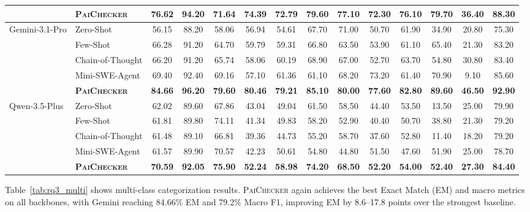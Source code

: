 \documentclass[sigconf, review, anonymous]{acmart}
\newcommand{\tool}{\textsc{PaiChecker}\xspace}
\begin{document}
\begin{table}[t]
{\begin{tabular}{ll c cccc ccccccc}
     & \textbf{\tool} & \textbf{76.62} & \textbf{94.20} & \textbf{71.64} & \textbf{74.39} & \textbf{72.79} & \textbf{79.60} & \textbf{77.10} & \textbf{72.30} & \textbf{76.10} & \textbf{79.70} & \textbf{36.40} & \textbf{88.30} \\
    \midrule
    \multirow{5}{*}{Gemini-3.1-Pro} & Zero-Shot & 56.15 & 88.20 & 58.06 & 56.94 & 54.61 & 67.70 & 71.00 & 50.70 & 61.90 & 34.90 & 20.80 & 75.30 \\
     & Few-Shot & 66.28 & 91.20 & 64.70 & 59.79 & 59.31 & 66.80 & 63.50 & 53.90 & 61.10 & 65.40 & 21.30 & 83.20 \\
     & Chain-of-Thought & 66.20 & 91.20 & 65.74 & 58.06 & 60.19 & 68.90 & 67.00 & 52.70 & 63.70 & 54.80 & 30.80 & 83.40 \\
     & Mini-SWE-Agent & 69.40 & 92.40 & 69.16 & 57.10 & 61.36 & 61.10 & 68.20 & 73.20 & 61.40 & 70.90 & 9.10 & 85.60 \\
     & \textbf{\tool} & \textbf{84.66} & \textbf{96.20} & \textbf{79.60} & \textbf{80.46} & \textbf{79.21} & \textbf{85.10} & \textbf{80.00} & \textbf{77.60} & \textbf{82.80} & \textbf{89.60} & \textbf{46.50} & \textbf{92.90} \\
    \midrule
    \multirow{5}{*}{Qwen-3.5-Plus} & Zero-Shot & 62.02 & 89.60 & 67.86 & 43.04 & 49.04 & 61.50 & 58.50 & 44.40 & 53.50 & 13.50 & 25.00 & 79.90 \\
     & Few-Shot & 61.81 & 89.80 & 74.11 & 41.34 & 49.83 & 58.20 & 52.90 & 40.40 & 50.70 & 38.80 & 21.30 & 79.20 \\
     & Chain-of-Thought & 61.48 & 89.10 & 66.81 & 39.36 & 44.73 & 55.20 & 58.70 & 37.60 & 52.80 & 11.40 & 18.20 & 79.20 \\
     & Mini-SWE-Agent & 61.57 & 89.90 & 70.57 & 42.23 & 50.61 & 54.80 & 44.80 & 51.50 & 47.60 & 51.90 & 25.00 & 78.70 \\
     & \textbf{\tool} & \textbf{70.59} & \textbf{92.05} & \textbf{75.90} & \textbf{52.24} & \textbf{58.98} & \textbf{74.20} & \textbf{68.50} & \textbf{52.20} & \textbf{54.00} & \textbf{52.40} & \textbf{27.30} & \textbf{84.40} \\
    \bottomrule
\end{tabular}%
}
\end{table}

Table~\ref{tab:rq3_multi} shows multi-class categorization results. \tool again achieves the best Exact Match (EM) and macro metrics on all backbones, with Gemini reaching 84.66\% EM and 79.2\% Macro F1, improving EM by 8.6--17.8 points over the strongest baseline.
\end{document}
